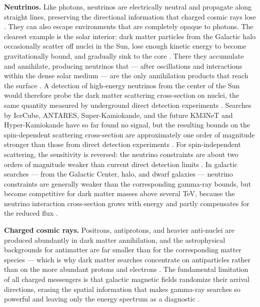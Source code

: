 \textbf{Neutrinos.}
Like photons, neutrinos are electrically neutral and propagate along straight lines, preserving the directional information that charged cosmic rays lose \cite{Cirelli:2024ssz,Hooper:2024}.
They can also escape environments that are completely opaque to photons.
The clearest example is the solar interior: dark matter particles from the Galactic halo occasionally scatter off nuclei in the Sun, lose enough kinetic energy to become gravitationally bound, and gradually sink to the core \cite{Cirelli:2024ssz}.
There they accumulate and annihilate, producing neutrinos that --- after oscillations and interactions within the dense solar medium --- are the only annihilation products that reach the surface \cite{Cirelli:2024ssz}.
A detection of high-energy neutrinos from the center of the Sun would therefore probe the dark matter scattering cross-section on nuclei, the same quantity measured by underground direct detection experiments \cite{Cirelli:2024ssz}.
Searches by IceCube, ANTARES, Super-Kamiokande, and the future KM3NeT and Hyper-Kamiokande have so far found no signal, but the resulting bounds on the spin-dependent scattering cross-section are approximately one order of magnitude stronger than those from direct detection experiments \cite{IceCube:2016dgk,Cirelli:2024ssz}.
For spin-independent scattering, the sensitivity is reversed: the neutrino constraints are about two orders of magnitude weaker than current direct detection limits \cite{Cirelli:2024ssz}.
In galactic searches --- from the Galactic Center, halo, and dwarf galaxies --- neutrino constraints are generally weaker than the corresponding gamma-ray bounds, but become competitive for dark matter masses above several TeV, because the neutrino interaction cross-section grows with energy and partly compensates for the reduced flux \cite{Cirelli:2024ssz}.

\textbf{Charged cosmic rays.}
Positrons, antiprotons, and heavier anti-nuclei are produced abundantly in dark matter annihilation, and the astrophysical backgrounds for antimatter are far smaller than for the corresponding matter species --- which is why dark matter searches concentrate on antiparticles rather than on the more abundant protons and electrons \cite{Cirelli:2024ssz}.
The fundamental limitation of all charged messengers is that galactic magnetic fields randomize their arrival directions, erasing the spatial information that makes gamma-ray searches so powerful and leaving only the energy spectrum as a diagnostic \cite{Cirelli:2024ssz,Pinetti:2021jjs}.

